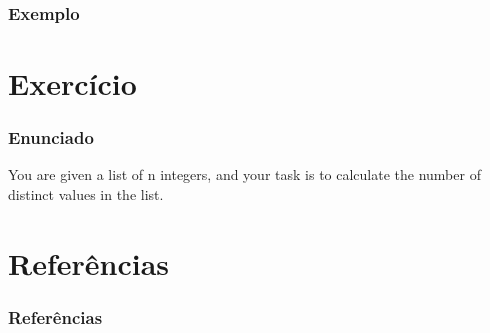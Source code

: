 \documentclass[12pt]{beamer}
\begin{document}
\begin{frame}
    \frametitle{Exemplo}

        

\end{frame}

\section{Exercício}\label{Exercício}
\begin{frame}
    \frametitle{Enunciado}

    You are given a list of n integers,
    and your task is to calculate the number
    of distinct values in the list.

\end{frame}

\section{Referências}\label{Referências}
\begin{frame}[allowframebreaks]
    \frametitle{Referências}
    
\end{frame}
\end{document}
